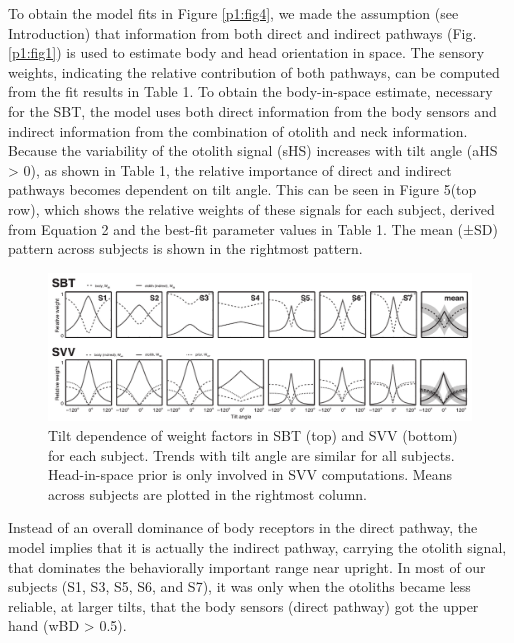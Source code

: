 To obtain the model fits in Figure \ref{p1:fig4}, we made the assumption (see Introduction) that information from both direct and indirect pathways (Fig. \ref{p1:fig1}) is used to estimate body and head orientation in space. The sensory weights, indicating the relative contribution of both pathways, can be computed from the fit results in Table 1. To obtain the body-in-space estimate, necessary for the SBT, the model uses both direct information from the body sensors and indirect information from the combination of otolith and neck information. Because the variability of the otolith signal (sHS) increases with tilt angle (aHS > 0), as shown in Table 1, the relative importance of direct and indirect pathways becomes dependent on tilt angle. This can be seen in Figure 5(top row), which shows the relative weights of these signals for each subject, derived from Equation 2 and the best-fit parameter values in Table 1. The mean (±SD) pattern across subjects is shown in the rightmost pattern. 

\begin{figure}
    \includegraphics[width=1.0\textwidth]{src/paper1/figure5.pdf}
    
    \caption{Tilt dependence of weight factors in SBT (top) and SVV (bottom) for each subject. Trends with tilt angle are similar for all subjects. Head-in-space prior is only involved in SVV computations. Means across subjects are plotted in the rightmost column.}
\end{figure}

Instead of an overall dominance of body receptors in the direct pathway, the model implies that it is actually the indirect pathway, carrying the otolith signal, that dominates the behaviorally important range near upright. In most of our subjects (S1, S3, S5, S6, and S7), it was only when the otoliths became less reliable, at larger tilts, that the body sensors (direct pathway) got the upper hand (wBD > 0.5). 

